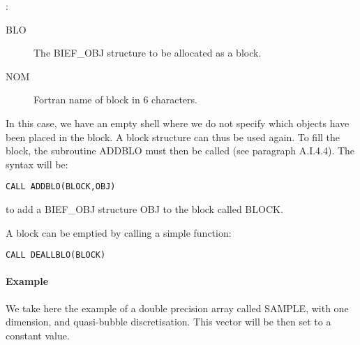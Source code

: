 :
\begin{description}
  \item [BLO] The BIEF\_OBJ structure to be allocated as a block.
  \item [NOM] Fortran name of block in 6 characters.
\end{description}
In this case, we have an empty shell where we do not specify which objects have
been placed in the block. A block structure can thus be used again. To fill the
block, the subroutine ADDBLO must then be called (see paragraph A.I.4.4). The
syntax will be:

\begin{lstlisting}[language=TelFortran]
CALL ADDBLO(BLOCK,OBJ)
\end{lstlisting}
to add a BIEF\_OBJ structure OBJ to the block called BLOCK.

A block can be emptied by calling a simple function:

\begin{lstlisting}[language=TelFortran]
CALL DEALLBLO(BLOCK)
\end{lstlisting}

\paragraph{Example}

We take here the example of a double precision array called SAMPLE, with one
dimension, and quasi-bubble discretisation. This vector will be then set to a
constant value.

